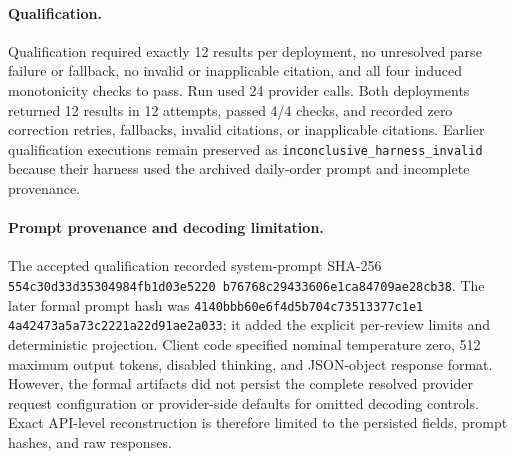 \paragraph{Qualification.}
Qualification required exactly 12 results per deployment, no unresolved parse
failure or fallback, no invalid or inapplicable citation, and all four induced
monotonicity checks to pass. Run
 used 24 provider calls. Both deployments
returned 12 results in 12 attempts, passed 4/4 checks, and recorded zero
correction retries, fallbacks, invalid citations, or inapplicable citations.
Earlier qualification executions remain preserved as
\texttt{inconclusive\_harness\_invalid} because their harness used the archived
daily-order prompt and incomplete provenance.

\paragraph{Prompt provenance and decoding limitation.}
The accepted qualification recorded system-prompt SHA-256
\texttt{554c30d33d353049\allowbreakdde84fb1d03e5220\allowbreak
b76768c29433606e\allowbreak1ca84709ae28cb38}.
The later formal prompt hash was
\texttt{4140bbb60e6f4d5b\allowbreak704c73513377c1e1\allowbreak
4a42473a5a73c222\allowbreakae1a22d91ae2a033};
it added the explicit per-review limits and deterministic projection. Client
code specified nominal temperature zero, 512 maximum output tokens, disabled
thinking, and JSON-object response format. However, the formal artifacts did
not persist the complete resolved provider request configuration or
provider-side defaults for omitted decoding controls. Exact API-level
reconstruction is therefore limited to the persisted fields, prompt hashes, and
raw responses.
